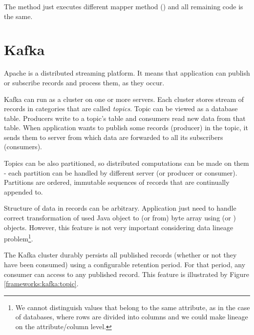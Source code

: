 The  method just executes different mapper method ()
and all remaining code is the same.




\section{Kafka \label{frameworks:kafka}}

Apache \citet{Kafka} is a distributed streaming platform.
It means that application can publish or subscribe records and
process them, as they occur.

Kafka can run as a cluster on one or more servers.
Each cluster stores stream of records in categories that are called \textit{topics}.
Topic can be viewed as a database table. Producers write to a topic's table
and consumers read new data from that table.
When application wants to publish some records (producer) in the topic,
it sends them to server from which data are forwarded to all its subscribers (consumers).

Topics can be also partitioned, so distributed computations can be made
on them - each partition can be handled by different server (or producer or consumer).
Partitions are ordered, immutable sequences of records that are continually appended to.

Structure of data in records can be arbitrary. Application just need to handle
correct transformation of used Java object to (or from) byte array using
 (or ) objects.
However, this feature is not very important considering data lineage problem\footnote{
  We cannot distinguish values that belong to the same attribute, as in the case
  of databases, where rows are divided into columns and we could make
  lineage on the attribute/column level.
}.

The Kafka cluster durably persists all published records (whether or not they have been consumed)
using a configurable retention period. For that period, any consumer can access
to any published record. This feature is illustrated by Figure \ref{frameworks:kafka:topic}.

